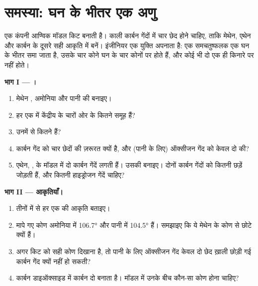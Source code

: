 \section{समस्या: घन के भीतर एक अणु}

\begin{problem}[{सप्ताहांत समस्या --- आण्विक मॉडल किट की कार्बन गेंदों की
रूपरेखा: छेद किस कोण पर किए जाएँ?}]
\label{pb:g10:lewis-and-shape:1}
एक कंपनी आण्विक मॉडल किट बनाती है। काली कार्बन गेंदों में चार छेद होने चाहिए,
ताकि मेथेन, एथेन और कार्बन के दूसरे  सही आकृति में
बनें। इंजीनियर एक युक्ति अपनाता है: एक समचतुष्फलक एक घन के भीतर
समा जाता है, उसके चार कोने घन के चार कोनों पर होते हैं, और कोई भी दो एक ही
किनारे पर नहीं होते।

\medskip
\noindent\textbf{भाग I --- ।}
\begin{enumerate}
  \item मेथेन , अमोनिया  और पानी  की  बनाइए।
  \item हर एक में केंद्रीय  के चारों ओर  के कितने समूह हैं?
  \item उनमें से कितने  हैं?
  \item कार्बन गेंद को चार छेदों की ज़रूरत क्यों है, और (पानी के लिए) ऑक्सीजन
        गेंद को केवल दो की?
  \item एथेन, , के मॉडल में दो कार्बन गेंदें लगती हैं। उसकी  बनाइए। दोनों कार्बन गेंदों को कितनी छड़ें जोड़ती हैं, और कितनी
        हाइड्रोजन गेंदें चाहिए?
\end{enumerate}

\medskip
\noindent\textbf{भाग II --- आकृतियाँ।}
\begin{enumerate}[resume]
  \item तीनों  में से हर एक की आकृति बताइए।
  \item मापे गए कोण अमोनिया में \ang{106.7} और पानी में \ang{104.5} हैं।
        समझाइए कि ये मेथेन के कोण से छोटे क्यों हैं।
  \item अगर किट को सही कोण दिखाना है, तो पानी के लिए ऑक्सीजन गेंद केवल दो
        छेद ख़ाली छोड़ी गई कार्बन गेंद क्यों नहीं हो सकती?
  \item कार्बन डाइऑक्साइड में कार्बन  दो  बनाता है। मॉडल में उनके
        बीच कौन-सा कोण होना चाहिए?
\end{enumerate}


\end{problem}
